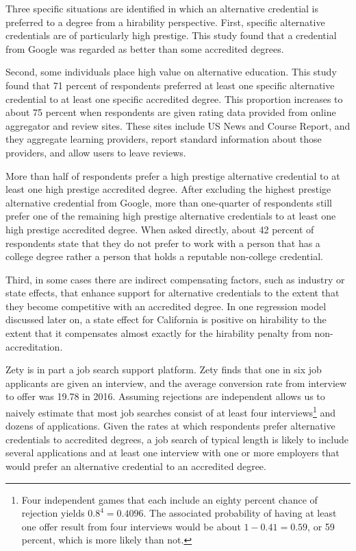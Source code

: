 \documentclass[review]{elsarticle}
\begin{document}
Three specific situations are identified in which an alternative credential is preferred to a degree from a hirability perspective.
First, specific alternative credentials are of particularly high prestige.
This study found that a credential from Google was regarded as better than some accredited degrees.

Second, some individuals place high value on alternative education.
This study found that 71 percent of respondents preferred at least one specific alternative credential to at least one specific accredited degree.
This proportion increases to about 75 percent when respondents are given rating data provided from online aggregator and review sites.
These sites include US News and Course Report, and they aggregate learning providers, report standard information about those providers, and allow users to leave reviews.

More than half of respondents prefer a high prestige alternative credential to at least one high prestige accredited degree.
After excluding the highest prestige alternative credential from Google,
more than one-quarter of respondents still prefer one of the remaining high prestige alternative credentials to at least one high prestige accredited degree.
When asked directly, about 42 percent of respondents state that they do not prefer
to work with a person that has a college degree rather a person that holds a reputable non-college credential.

Third, in some cases there are indirect compensating factors, such as industry or state effects,
that enhance support for alternative credentials to the extent that they become competitive with an accredited degree.
In one regression model discussed later on, a state effect for California is positive on hirability
to the extent that it compensates almost exactly for the hirability penalty from non-accreditation.

Zety is in part a job search support platform.
Zety finds that one in six job applicants are given an interview,
and the average conversion rate from interview to offer was 19.78 in 2016\cite{turczynski_2021}.
Assuming rejections are independent allows us to naively estimate that most job searches consist of at least four interviews\footnote{
    Four independent games that each include an eighty percent chance of rejection yields $0.8^4 = 0.4096$.
    The associated probability of having at least one offer result from four interviews would be about $1 - 0.41 = 0.59$,
    or 59 percent, which is more likely than not.
} and dozens of applications.
Given the rates at which respondents prefer alternative credentials to accredited degrees,
a job search of typical length is likely to include several applications and at least one interview
with one or more employers that would prefer an alternative credential to an accredited degree.
\end{document}

